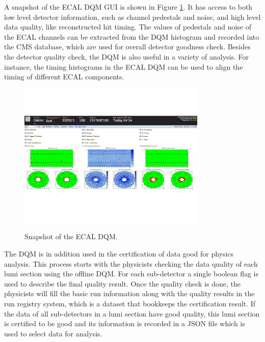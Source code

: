 \documentclass[thesis.tex]{subfiles}
\begin{document}
A snapshot of the ECAL DQM GUI is shown in Figure \ref{fig:ecaldqm}.
It has access to both low level detector information, such as channel pedestals and noise, and high level data quality, like reconstructed hit timing. 
The values of pedestals and noise of the ECAL channels can be extracted from the DQM histogram and recorded into the CMS database, which are used for overall detector goodness check.
Besides the detector quality check, the DQM is also useful in a variety of analysis. 
For instance, the timing histograms in the ECAL DQM can be used to align the timing of different ECAL components. 

\begin{figure}[hbtp]
	\centering
	\includegraphics[width=0.8\textwidth]{Fig/ecaldqm.pdf}
	\label{fig:ecaldqm}
	\caption{Snapshot of the ECAL DQM.}
\end{figure}

The DQM is in addition used in the certification of data good for physics analysis.
This process starts with the physicists checking the data quality of each lumi section using the offline DQM.
For each sub-detector a single boolean flag is used to describe the final quality result.
Once the quality check is done, the physicists will fill the basic run information along with the quality results in the run registry system, which is a dataset that bookkeeps the certification result.
If the data of all sub-detectors in a lumi section have good quality, this lumi section is certified to be good and its information is recorded in a JSON file which is used to select data for analysis. 
\end{document}
